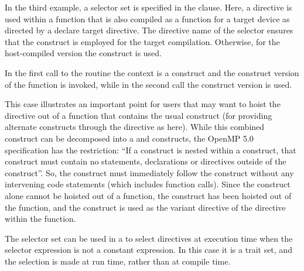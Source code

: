 
In the third example, a  selector set is specified in the  clause.
Here, a  directive is used within a function that is also
compiled as a function for a target device as directed by a declare target directive.
The  directive name of the  selector ensures that the
 construct is employed for the target compilation.
Otherwise, for the host-compiled version the  construct is used.

In the first call to the  routine the context is a
 construct and the 
construct version of the function is invoked,
while in the second call the  construct version is used.

This case illustrates an important point for users that may want to hoist the 
 directive out of a function that contains the usual 
 construct
(for providing alternate constructs through the  directive as here).
While this combined construct can be decomposed into a  and
 constructs, the OpenMP 5.0 specification has the restriction:
``If a  construct is nested within a  construct, that  construct must
contain no statements, declarations or directives outside of the  construct''.
So, the  construct must immediately follow the  construct without any intervening
code statements (which includes function calls).  
Since the  construct alone cannot be hoisted out of a function, 
the  construct has been hoisted out of the function, and 
the  construct is used
as the variant directive of the  directive within the function.


\pagebreak


The  selector set can be used in a 
to select directives at execution time when the 
 selector expression is not a constant expression.
In this case it is a  trait set, and the selection is made at run time, rather
than at compile time.

